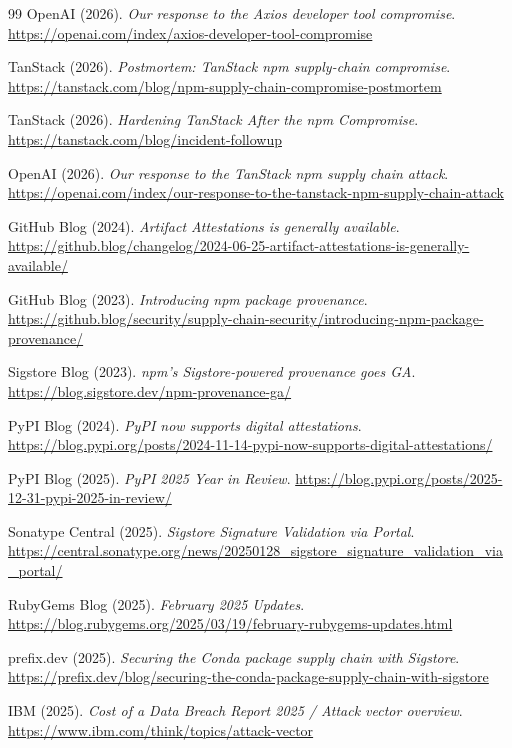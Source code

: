 \documentclass[12pt,a4paper]{article}
\begin{document}
\begin{thebibliography}{99}
OpenAI (2026).
\textit{Our response to the Axios developer tool compromise}.
\url{https://openai.com/index/axios-developer-tool-compromise}

TanStack (2026).
\textit{Postmortem: TanStack npm supply-chain compromise}.
\url{https://tanstack.com/blog/npm-supply-chain-compromise-postmortem}

TanStack (2026).
\textit{Hardening TanStack After the npm Compromise}.
\url{https://tanstack.com/blog/incident-followup}

OpenAI (2026).
\textit{Our response to the TanStack npm supply chain attack}.
\url{https://openai.com/index/our-response-to-the-tanstack-npm-supply-chain-attack}

GitHub Blog (2024).
\textit{Artifact Attestations is generally available}.
\url{https://github.blog/changelog/2024-06-25-artifact-attestations-is-generally-available/}

GitHub Blog (2023).
\textit{Introducing npm package provenance}.
\url{https://github.blog/security/supply-chain-security/introducing-npm-package-provenance/}

Sigstore Blog (2023).
\textit{npm's Sigstore-powered provenance goes GA}.
\url{https://blog.sigstore.dev/npm-provenance-ga/}

PyPI Blog (2024).
\textit{PyPI now supports digital attestations}.
\url{https://blog.pypi.org/posts/2024-11-14-pypi-now-supports-digital-attestations/}

PyPI Blog (2025).
\textit{PyPI 2025 Year in Review}.
\url{https://blog.pypi.org/posts/2025-12-31-pypi-2025-in-review/}

Sonatype Central (2025).
\textit{Sigstore Signature Validation via Portal}.
\url{https://central.sonatype.org/news/20250128_sigstore_signature_validation_via_portal/}

RubyGems Blog (2025).
\textit{February 2025 Updates}.
\url{https://blog.rubygems.org/2025/03/19/february-rubygems-updates.html}

prefix.dev (2025).
\textit{Securing the Conda package supply chain with Sigstore}.
\url{https://prefix.dev/blog/securing-the-conda-package-supply-chain-with-sigstore}

IBM (2025).
\textit{Cost of a Data Breach Report 2025 / Attack vector overview}.
\url{https://www.ibm.com/think/topics/attack-vector}


\end{thebibliography}
\end{document}
